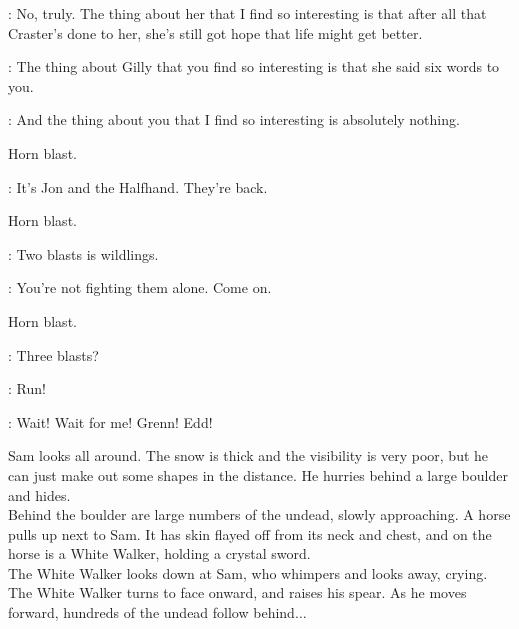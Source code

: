 \SAM: No, truly. The thing about her that I find so interesting is that after all that Craster's done to her, she's still got hope that life might get better. 

\EDD: The thing about Gilly that you find so interesting is that she said six words to you. 

\SAM:  And the thing about you that I find so interesting is absolutely nothing. 

\sfx Horn blast.

\SAM: It's Jon and the Halfhand. They're back.

\sfx Horn blast.

\GRENN:  Two blasts is wildlings. 

\EDD: You're not fighting them alone. Come on. 

\sfx Horn blast.


\GRENN: Three blasts? 

\EDD:  Run! 


\SAM:  Wait! Wait for me!  Grenn! Edd! 


\n Sam looks all around. The snow is thick and the visibility is very poor, but he can just make out some shapes in the distance. He hurries behind a large boulder and hides.\\
Behind the boulder are large numbers of the undead, slowly approaching. A horse pulls up next to Sam. It has skin flayed off from its neck and chest, and on the horse is a White Walker, holding a crystal sword.\\
The White Walker looks down at Sam, who whimpers and looks away, crying. The White Walker turns to face onward, and raises his spear. As he moves forward, hundreds of the undead follow behind$\ldots$


